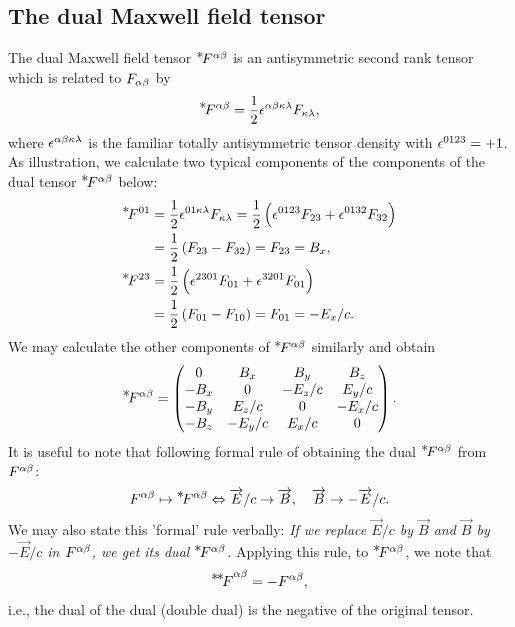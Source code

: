 \subsection{The dual Maxwell field tensor}
The {dual Maxwell field tensor} ${}^{{\textstyle \ast}} \negthinspace{F} ^{{\alpha}{\beta}}$ is
an antisymmetric second rank tensor which is related to
$F_{{\alpha}{\beta}}$ by
\begin{align}\label{ved.34x}
{}^{{\textstyle \ast}} \negthinspace{F} ^{{\alpha}{\beta}}=\frac{1}{2}\epsilon^{{\alpha}{\beta} {\kappa}{\lambda}}
F_{ {\kappa}{\lambda}},
\end{align}
where $\epsilon^{{\alpha}{\beta} {\kappa}{\lambda}}$ is the familiar {totally 
antisymmetric tensor density} with $\epsilon^{0123}=+1$. As 
illustration, we calculate two typical components of the 
components of the dual tensor ${}^{{\textstyle \ast}} \negthinspace{F} ^{{\alpha}{\beta}}$ below:
\begin{align*}
{}^{{\textstyle \ast}} \negthinspace{F} ^{01}
&=\frac{1}{2}\epsilon^{01 {\kappa}{\lambda}}F_{{\kappa}{\lambda}}
=\frac{1}{2}\left(\epsilon^{0123}F_{23}+
\epsilon^{0132}F_{32}\right)\\ &=\frac{1}{2}\left(
F_{23}-F_{32}\right)=F_{23}=B_x,\\
{}^{{\textstyle \ast}} \negthinspace{F} ^{23}&=\frac{1}{2}\left( \epsilon^{2301}F_{01}+
\epsilon^{3201}F_{01}\right) \\&=\frac{1}{2}\left(
F_{01}-F_{10}\right)=F_{01}=-E_x/c.
\end{align*}
We may calculate the other components of 
${}^{{\textstyle \ast}} \negthinspace{F} ^{{\alpha}{\beta}}$ similarly and obtain
\begin{align}\label{ved.35x}
{}^{{\textstyle \ast}} \negthinspace{F} ^{{\alpha}{\beta}}=\begin{pmatrix}
 0 & B_x  & B_y & B_z\\
-B_x & 0   & -E_z/c & E_y/c\\
-B_y & E_z/c & 0  & -E_x/c\\
-B_z & -E_y/c & E_x/c & 0\\ \end{pmatrix}  .
\end{align}
It is useful to note that following formal rule of obtaining
the dual ${}^{{\textstyle \ast}} \negthinspace{F} ^{{\alpha}{\beta}}$ from $F^{{\alpha}{\beta}}$:
\begin{align}\label{ved.36x}
F^{{\alpha}{\beta}} \mapsto {}^{{\textstyle \ast}} \negthinspace{F} ^{{\alpha}{\beta}}\Leftrightarrow
\overrightarrow{E}/c\rightarrow \overrightarrow{B},\quad \overrightarrow{B}\rightarrow 
-\overrightarrow{E}/c.
\end{align}
We may also state this 'formal' rule verbally: \textsl{If 
we 
replace $\vec{E}/c$ by $\vec{B}$ and $\vec{B}$ by 
$-\vec{E}/c$ 
in $F^{{\alpha}{\beta}}$, we get its dual ${}^{{\textstyle \ast}} \negthinspace{F} ^{{\alpha}{\beta}}$.} 
Applying this rule, to ${}^{{\textstyle \ast}} \negthinspace{F} ^{{\alpha}{\beta}}$, we note that
\begin{align}\label{ved.37x}
{}^{{\textstyle \ast}} \negthinspace{\ensuremath{{}^{{\textstyle \ast}} \negthinspace{F} } } ^{{\alpha}{\beta}}=-F^{{\alpha}{\beta}},
\end{align}
i.e., the dual of the dual (double dual) is the negative of 
the original tensor.

